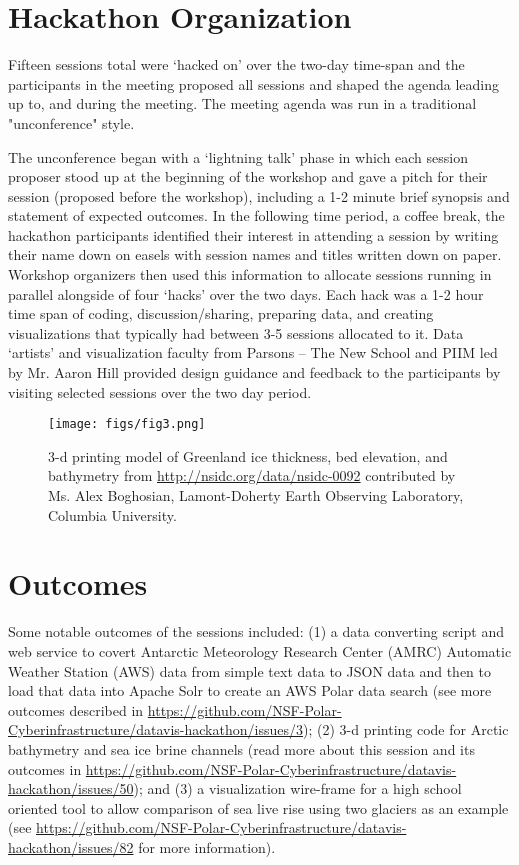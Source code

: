 \documentclass[11pt]{article}
\begin{document}

\section{Hackathon Organization}
Fifteen sessions total were `hacked on' over the two-day time-span and the participants in the meeting proposed all sessions and shaped the agenda leading up to, and during the meeting. The meeting agenda was run in a traditional "unconference" style. 

The unconference began with a `lightning talk' phase in which each session proposer stood up at the beginning of the workshop and gave a pitch for their session (proposed before the workshop), including a 1-2 minute brief synopsis and statement of expected outcomes. In the following time period, a coffee break, the hackathon participants identified their interest in attending a session by writing their name down on easels with session names and titles written down on paper. Workshop organizers then used this information to allocate sessions running in parallel alongside of four `hacks' over the two days. Each hack was a 1-2 hour time span of coding, discussion/sharing, preparing data, and creating visualizations that typically had between 3-5 sessions allocated to it. Data `artists' and visualization faculty from Parsons -- The New School and PIIM led by Mr. Aaron Hill provided design guidance and feedback to the participants by visiting selected sessions over the two day period.

\begin{figure*}[htp]
    \centering
    \texttt{[image: figs/fig3.png]}
    \caption{3-d printing model of Greenland ice thickness, bed elevation, and bathymetry from \protect\url{http://nsidc.org/data/nsidc-0092} contributed by Ms. Alex Boghosian, Lamont-Doherty Earth Observing Laboratory, Columbia University.}
    \label{fig:website}
\end{figure*}

\section{Outcomes}
Some notable outcomes of the sessions included: (1) a data converting script and web service to covert Antarctic Meteorology Research Center (AMRC) Automatic Weather Station (AWS) data from simple text data to JSON data and then to load that data into Apache Solr to create an AWS Polar data search (see more outcomes described in \url{https://github.com/NSF-Polar-Cyberinfrastructure/datavis-hackathon/issues/3}); (2) 3-d printing code for Arctic bathymetry and sea ice brine channels (read more about this session and its outcomes in \url{https://github.com/NSF-Polar-Cyberinfrastructure/datavis-hackathon/issues/50}); and (3) a visualization wire-frame for a high school oriented tool to allow comparison of sea live rise using two glaciers as an example (see \url{https://github.com/NSF-Polar-Cyberinfrastructure/datavis-hackathon/issues/82} for more information). 
\end{document}
